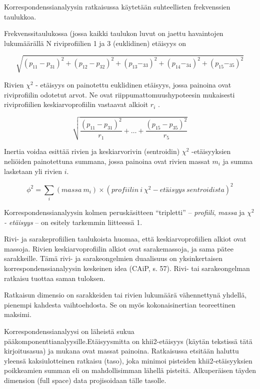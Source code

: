\documentclass[
  finnish,
]{book}
\begin{document}
Korrespondenssianalyysin ratkaisussa käytetään suhteellisten frekvenssien
taulukkoa.

Frekvenssitaulukossa (jossa kaikki taulukon luvut on jaettu havaintojen
lukumäärällä N riviprofiilien 1 ja 3 (euklidinen) etäisyys on

\begin{equation}
 \sqrt{(p_{11} - p_{31})^2 + (p_{12} - p_{32})^2 + (p_{13} - _{33})^2+ (p_{14} - _{34})^2+ (p_{15} - _{35})^2}
 \label{eq:euclid1}
 \end{equation}

Rivien \(\chi^{2}\) - etäisyys on painotettu euklidinen etäisyys, jossa painoina
ovat riviprofiilin odotetut arvot. Ne ovat riippumattomuushypoteesin mukaisesti
riviprofiilien keskiarvoprofiilin vastaavat alkioit \(r_{i}\) .

\begin{equation}
 \sqrt{\frac{(p_{11} - p_{31})^2} { r_{1}} + \dots + \frac{(p_{15} - p_{35})^2} {r_{5}}}
 \label{eq:euclid2}
\end{equation}

Inertia voidaa esittää rivien ja keskiarvorivin (sentroidin) \(\chi^{2}\) -etäisyyksien
neliöiden painotettuna summana, jossa painoina ovat rivien massat \(m_{i}\) ja
summa lasketaan yli rivien \({i}\).

\begin{equation}
 \phi^{2} = \sum_{i} (massa \: m_{i}) \times (profiilin \: i \: \chi^{2} - etäisyys \: sentroidista)^{2}
 \label{eq:inert2}
\end{equation}

Korrespondenssianalyysin kolmen peruskäsitteen ``tripletti'' -- \emph{profiili},
\emph{massa} ja \emph{\(\chi^{2}\) - etäisyys} -- on esitely tarkemmin liitteessä 1.

Rivi- ja sarakeprofiilien taulukoista huomaa, että keskiarvoprofiilien
alkiot ovat massoja. Rivien keskiarvoprofiilin alkiot ovat sarakemassoja, ja sama
pätee sarakkeille. Tämä rivi- ja sarakeongelmien duaalisuus on yksinkertaisen
korrespondenssianalyysin keskeinen idea (CAiP, s. 57). Rivi- tai sarakeongelman
ratkaisu tuottaa saman tuloksen.

Ratkaisun dimensio on sarakkeiden tai rivien lukumäärä vähennettynä yhdellä,
pienempi kahdesta vaihtoehdosta. Se on myös kokonaisinertian teoreettinen maksimi.

Korrespondenssianalyysi on läheistä sukua pääkomponenttianalyysille.Etäisyysmitta on
khii2-etäisyys (käytän tekstissä tätä kirjoitusasua) ja mukana ovat massat painoina.
Ratkaisussa etsitään haluttu yleensä kaksiulotteinen ratkaisu (taso), joka minimoi pisteiden
khii2-etäisyyksien poikkeamien summan eli on mahdollisimman lähellä pisteitä.
Alkuperäisen täyden dimension (full space) data projisoidaan tälle tasolle.
\end{document}
